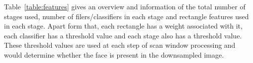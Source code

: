 \vspace{-0.1in}
\begin{table}[h]
    \centering
    \vspace{0.05in}
    \caption{Arch. details of the CPU used}
    \label{table:cpu}
\end{table}

\vspace{0.3in}
Table~\ref{table:features} gives an overview and information of the total number of stages
used, number of filers/classifiers in each stage and rectangle features used in each stage.
Apart form that, each rectangle has a weight associated with it, each classifier has a threshold value and each stage
also has a threshold value. These threshold values are used at each step of scan window processing
and would determine whether the face is present in the downsampled image. 



